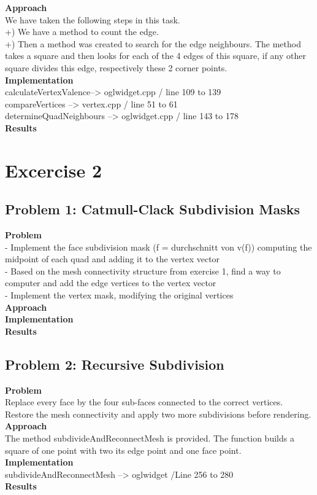 \documentclass[12pt,a4paper]{scrartcl}
\begin{document}
\textbf{Approach}\\
We have taken the following steps in this task.\\
+) We have a method to count the edge.\\
+) Then a method was created to search for the edge neighbours. The method takes a square and then looks for each of the 4 edges of this square, if any other square divides this edge, respectively these 2 corner points.\\[0,5cm]

\textbf{Implementation}\\
calculateVertexValence--> oglwidget.cpp / line 109 to 139\\
compareVertices --> vertex.cpp / line 51 to 61\\
determineQuadNeighbours --> oglwidget.cpp / line 143 to 178\\[0,5cm]

\textbf{Results}\\


\newpage

\section{Excercise 2}

\subsection{Problem 1: Catmull-Clack Subdivision Masks}

\large
\textbf{Problem}\\
- Implement the face subdivision mask (f = durchschnitt von v(f)) computing the midpoint of each quad and adding it to the vertex vector\\
- Based on the mesh connectivity structure from exercise 1, find a way to computer and add the edge vertices to the vertex vector\\
- Implement the vertex mask, modifying the original vertices\\
 
\textbf{Approach}\\
\textbf{Implementation}\\
\textbf{Results}\\
\subsection{Problem 2: Recursive Subdivision}

\large
\textbf{Problem}\\
Replace every face by the four sub-faces connected to the correct vertices. Restore the mesh
connectivity and apply two more subdivisions before rendering. \\
\textbf{Approach}\\
The method subdivideAndReconnectMesh is provided. The function builds a square of one point with two its edge point and one face point.\\
\textbf{Implementation}\\
subdivideAndReconnectMesh --> oglwidget /Line 256 to 280\\
\textbf{Results}\\
\end{document}
